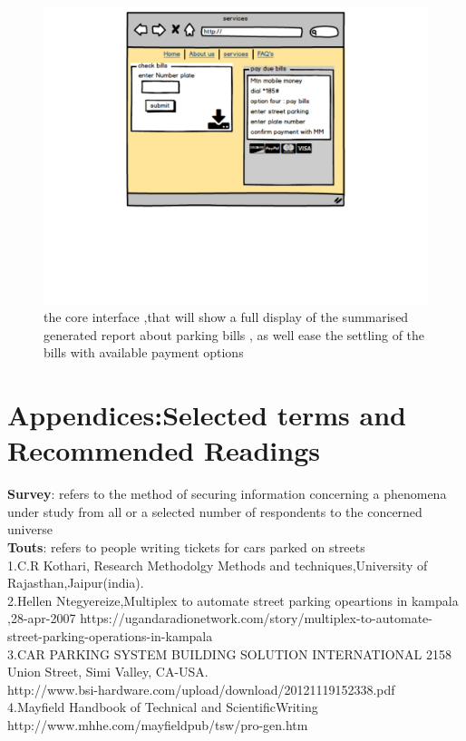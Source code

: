 \documentclass[12pt]{article}
\begin{document}
\begin{figure}
  \includegraphics[width=\linewidth]{services.pdf}
 \caption{the core interface ,that will show a full display of the summarised generated report about parking bills , as well ease the settling of the bills with available payment options  }
  \end{figure} 

\newpage


\section{Appendices:\sc Selected terms and Recommended Readings}

\textbf {Survey}: refers to the method of securing information concerning a phenomena under study from all or a selected number of respondents to the concerned universe\\
\textbf {Touts}: refers to people writing tickets for cars parked on streets\\


1.C.R Kothari, Research Methodolgy Methods and techniques,University of Rajasthan,Jaipur(india).\\

2.Hellen Ntegyereize,Multiplex to automate street parking opeartions in kampala ,28-apr-2007 
 https://ugandaradionetwork.com/story/multiplex-to-automate-street-parking-operations-in-kampala\\

3.CAR PARKING SYSTEM BUILDING SOLUTION INTERNATIONAL 2158 Union Street, Simi Valley, CA-USA.\\ 
http://www.bsi-hardware.com/upload/download/20121119152338.pdf \\

4.Mayfield Handbook of Technical and ScientificWriting\\
 http://www.mhhe.com/mayfieldpub/tsw/pro-gen.htm

 








       
\end{document}
